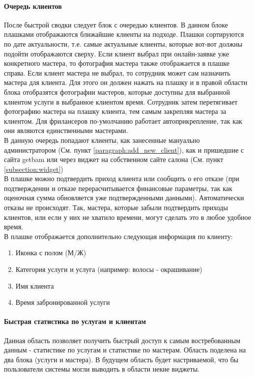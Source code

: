 \documentclass[DIV=calc, paper=a4, fontsize=11pt]{scrartcl} %
\begin{document}
\paragraph{Очередь клиентов} \label{paragraph:plashki}
После быстрой сводки следует блок с очередью клиентов. В данном блоке плашками отображаются ближайшие клиенты на подходе. Плашки сортируются по дате актуальности, т.е. самые актуальные клиенты, которые вот-вот должны подойти отображаются сверху. Если клиент выбрал при онлайн-заявке уже конкретного мастера, то фотография мастера также отображается в плашке справа. Если клиент мастера не выбрал, то сотрудник может сам назначить мастера для клиента. Для этого он должен нажать на плашку и в правой области блока отобразятся фотографии мастеров, которые доступны для выбранной клиентом услуги в выбранное клиентом время. Сотрудник затем перетягивает фотографию мастера на плашку клиента, тем самым закрепляя мастера за клиентом. Для фрилансеров по-умолчанию работает автоприкрепление, так как они являются единственными мастерами.
\\[0.5cm]
В данную очередь попадают клиенты, как занесенные мануально администратором (См. пункт \ref{paragraph:add_new_client}), как и пришедшие с сайта getbam или через виджет на собственном сайте салона (См. пункт \ref{subsection:widget})
\\[0.5cm]
В плашке можно подтвердить приход клиента или сообщить о его отказе (при подтверждении и отказе перерасчитывается финансовые параметры, так как оценочная сумма обновляется уже подтвержденными данными). Автоматически отказы не происходят. Так, мастера, которые забыли подтвердить приходы клиентов, или если у них не хватило времени, могут сделать это в любое удобное время.
\\[0.5cm]
В плашке отображается дополнительно следующая информация по клиенту:

    \begin{enumerate}
        \item Иконка с полом (М/Ж)
        \item Категория услуги и услуга (например: волосы - окрашивание)
        \item Имя клиента
        \item Время забронированной услуги
    \end{enumerate}
    
\paragraph{Быстрая статистика по услугам и клиентам}
Данная область позволяет получить быстрый доступ к самым востребованным данным - статистике по услугам и статистике по мастерам. Область поделена на два блока (услуги и мастера). В будущем область будет настриваемой, что бы пользователи системы могли выводить в области некие виджеты.
\end{document}
